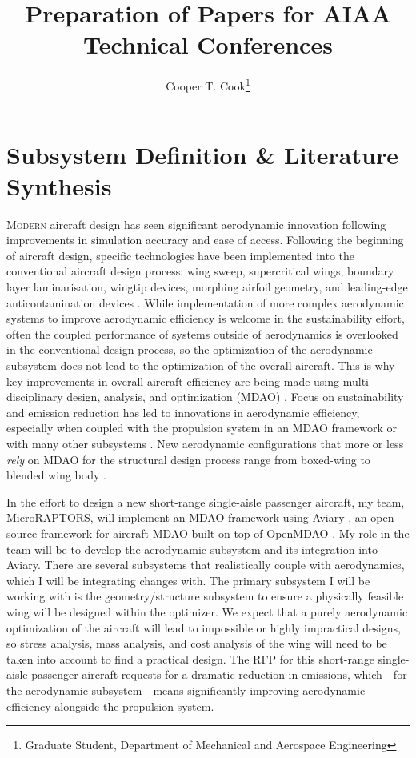 \documentclass[conf]{new-aiaa}
\title{Preparation of Papers for AIAA Technical Conferences}
\author{Cooper T. Cook\footnote{Graduate Student, Department of Mechanical and Aerospace Engineering}}
\affil{University of California, Davis, California 95616}
\begin{document}
\maketitle

\section{Subsystem Definition \& Literature Synthesis}
\lettrine{M}{odern} aircraft design has seen significant aerodynamic innovation following improvements in simulation accuracy and ease of access. Following the beginning of aircraft design, specific technologies have been implemented into the conventional aircraft design process: wing sweep, supercritical wings, boundary layer laminarisation, wingtip devices, morphing airfoil geometry, and leading-edge anticontamination devices \cite{coelho_barbosa_aircraft_2023}. While implementation of more complex aerodynamic systems to improve aerodynamic efficiency is welcome in the sustainability effort, often the coupled performance of systems outside of aerodynamics is overlooked in the conventional design process, so the optimization of the aerodynamic subsystem does not lead to the optimization of the overall aircraft. This is why key improvements in overall aircraft efficiency are being made using multi-disciplinary design, analysis, and optimization (MDAO) \cite{leng_multidisciplinary_2025}. Focus on sustainability and emission reduction has led to innovations in aerodynamic efficiency, especially when coupled with the propulsion system in an MDAO framework \cite{bravo-mosquera_design_2022} or with many other subsystems \cite{press_of_acta_aero_et_astro_sinica_integrated_2026}. New aerodynamic configurations that more or less \emph{rely} on MDAO for the structural design process range from boxed-wing \cite{jemitola_analysis_2023} to blended wing body \cite{handa_recent_2022}.

In the effort to design a new short-range single-aisle passenger aircraft, my team, MicroRAPTORS, will implement an MDAO framework using Aviary \cite{gratz_aviary_2024}, an open-source framework for aircraft MDAO built on top of OpenMDAO \cite{gray_openmdao_2019}. My role in the team will be to develop the aerodynamic subsystem and its integration into Aviary. There are several subsystems that realistically couple with aerodynamics, which I will be integrating changes with. The primary subsystem I will be working with is the geometry/structure subsystem to ensure a physically feasible wing will be designed within the optimizer. We expect that a purely aerodynamic optimization of the aircraft will lead to impossible or highly impractical designs, so stress analysis, mass analysis, and cost analysis of the wing will need to be taken into account to find a practical design. The RFP for this short-range single-aisle passenger aircraft requests for a dramatic reduction in emissions, which---for the aerodynamic subsystem---means significantly improving aerodynamic efficiency alongside the propulsion system.
\end{document}
